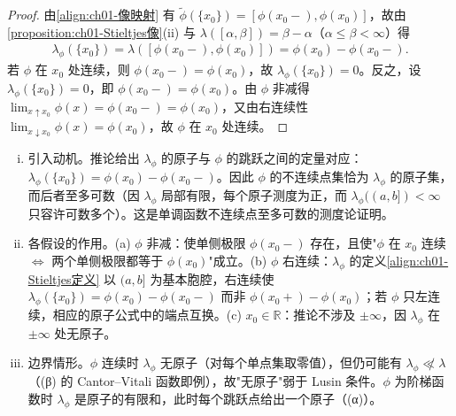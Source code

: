 \documentclass[../../main.tex]{subfiles}%
\begin{document}
\begin{proof}
由\eqref{align:ch01-像映射} 有 $\widetilde{\phi}(\{x_0\})=[\phi(x_0-),\phi(x_0)]$，故由\cref{proposition:ch01-Stieltjes像}(ii) 与 $\lambda([\alpha,\beta])=\beta-\alpha$（$\alpha\leqslant\beta<\infty$）得
\begin{align*}
\lambda_\phi(\{x_0\})=\lambda([\phi(x_0-),\phi(x_0)])=\phi(x_0)-\phi(x_0-).
\end{align*}
若 $\phi$ 在 $x_0$ 处连续，则 $\phi(x_0-)=\phi(x_0)$，故 $\lambda_\phi(\{x_0\})=0$。反之，设 $\lambda_\phi(\{x_0\})=0$，即 $\phi(x_0-)=\phi(x_0)$。由 $\phi$ 非减得 $\lim_{x\uparrow x_0}\phi(x)=\phi(x_0-)=\phi(x_0)$，又由右连续性 $\lim_{x\downarrow x_0}\phi(x)=\phi(x_0)$，故 $\phi$ 在 $x_0$ 处连续。
\end{proof}

\begin{remark}\label{remark:ch01-Stieltjes连续}
\begin{enumerate}[(i)]
\item 引入动机。推论给出 $\lambda_\phi$ 的原子与 $\phi$ 的跳跃之间的定量对应：$\lambda_\phi(\{x_0\})=\phi(x_0)-\phi(x_0-)$。因此 $\phi$ 的不连续点集恰为 $\lambda_\phi$ 的原子集，而后者至多可数（因 $\lambda_\phi$ 局部有限，每个原子测度为正，而 $\lambda_\phi((a,b])<\infty$ 只容许可数多个）。这是单调函数不连续点至多可数的测度论证明。
\item 各假设的作用。(a) $\phi$ 非减：使单侧极限 $\phi(x_0-)$ 存在，且使"$\phi$ 在 $x_0$ 连续 $\iff$ 两个单侧极限都等于 $\phi(x_0)$"成立。(b) $\phi$ 右连续：$\lambda_\phi$ 的定义\eqref{align:ch01-Stieltjes定义} 以 $(a,b]$ 为基本胞腔，右连续使 $\lambda_\phi(\{x_0\})=\phi(x_0)-\phi(x_0-)$ 而非 $\phi(x_0+)-\phi(x_0)$；若 $\phi$ 只左连续，相应的原子公式中的端点互换。(c) $x_0\in\mathbb{R}$：推论不涉及 $\pm\infty$，因 $\lambda_\phi$ 在 $\pm\infty$ 处无原子。
\item 边界情形。$\phi$ 连续时 $\lambda_\phi$ 无原子（对每个单点集取零值），但仍可能有 $\lambda_\phi\not\ll\lambda$（(β) 的 Cantor--Vitali 函数即例），故"无原子"弱于 Lusin 条件。$\phi$ 为阶梯函数时 $\lambda_\phi$ 是原子的有限和，此时每个跳跃点给出一个原子（(α)）。
\end{enumerate}
\end{remark}
\end{document}
